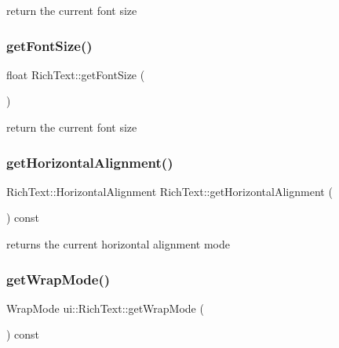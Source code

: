 return the current font size \mbox{\label{classui_1_1RichText_af30313070309eb44097c18abcedb4957}} 
\subsubsection{\texorpdfstring{get\+Font\+Size()}{getFontSize()}\hspace{0.1cm}{\footnotesize\ttfamily [2/2]}}
{\footnotesize\ttfamily float Rich\+Text\+::get\+Font\+Size (\begin{DoxyParamCaption}{ }\end{DoxyParamCaption})}

return the current font size \mbox{\label{classui_1_1RichText_a491a30899b80e68cc539bff9c075f9d4}} 
\subsubsection{\texorpdfstring{get\+Horizontal\+Alignment()}{getHorizontalAlignment()}}
{\footnotesize\ttfamily Rich\+Text\+::\+Horizontal\+Alignment Rich\+Text\+::get\+Horizontal\+Alignment (\begin{DoxyParamCaption}{ }\end{DoxyParamCaption}) const}

returns the current horizontal alignment mode \mbox{\label{classui_1_1RichText_a20353e463ebf2676380e88cdf4143e07}} 
\subsubsection{\texorpdfstring{get\+Wrap\+Mode()}{getWrapMode()}\hspace{0.1cm}{\footnotesize\ttfamily [1/2]}}
{\footnotesize\ttfamily Wrap\+Mode ui\+::\+Rich\+Text\+::get\+Wrap\+Mode (\begin{DoxyParamCaption}{ }\end{DoxyParamCaption}) const}

